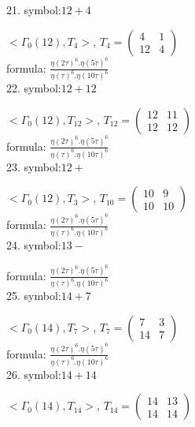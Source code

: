 21. symbol:$ 12+4 $

$ < \Gamma_0 ( 12 ), T_{4} >  $,
$
T_{4} = 
\left(
\begin{array}{cc}
4 & 1 \\
12 & 4
\end{array}
\right)
$
\\

formula: 
$ \frac{\eta(2\tau)^6 . \eta(5\tau)^6}{\eta(\tau)^6 . \eta(10\tau)^6} $
\\

22. symbol:$ 12+12 $

$ < \Gamma_0 ( 12 ), T_{12} >  $,
$
T_{12} = 
\left(
\begin{array}{cc}
12 & 11 \\
12 & 12
\end{array}
\right)
$
\\

formula: 
$ \frac{\eta(2\tau)^6 . \eta(5\tau)^6}{\eta(\tau)^6 . \eta(10\tau)^6} $
\\

23. symbol:$ 12+ $

$ < \Gamma_0 ( 12 ), T_{3} >  $,
$
T_{10} = 
\left(
\begin{array}{cc}
10 & 9 \\
10 & 10
\end{array}
\right)
$
\\

formula: 
$ \frac{\eta(2\tau)^6 . \eta(5\tau)^6}{\eta(\tau)^6 . \eta(10\tau)^6} $
\\

24. symbol:$ 13- $

formula: 
$ \frac{\eta(2\tau)^6 . \eta(5\tau)^6}{\eta(\tau)^6 . \eta(10\tau)^6} $
\\

25. symbol:$ 14+7 $

$ < \Gamma_0 ( 14 ), T_{7} >  $,
$
T_{7} = 
\left(
\begin{array}{cc}
7 & 3 \\
14 & 7
\end{array}
\right)
$
\\

formula: 
$ \frac{\eta(2\tau)^6 . \eta(5\tau)^6}{\eta(\tau)^6 . \eta(10\tau)^6} $
\\

26. symbol:$ 14+14 $

$ < \Gamma_0 ( 14 ), T_{14} >  $,
$
T_{14} = 
\left(
\begin{array}{cc}
14 & 13 \\
14 & 14
\end{array}
\right)
$
\\

